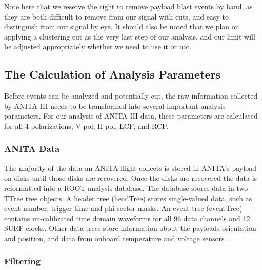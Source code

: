 Note here that we reserve the right to remove payload blast events by hand, as they are both difficult to remove from our signal with cuts, and easy to distinguish from our signal by eye.  It should also be noted that we plan on applying a clustering cut as the very last step of our analysis, and our limit will be adjusted appropriately whether we need to use it or not.

\subsection{The Calculation of Analysis Parameters}

Before events can be analyzed and potentially cut, the raw information collected by ANITA-III needs to be transformed into several important analysis parameters.  For our analysis of ANITA-III data, these parameters are calculated for all 4 polarizations, V-pol, H-pol, LCP, and RCP.

\subsubsection{ANITA Data}

The majority of the data an ANITA flight collects is stored in ANITA's payload on disks until those disks are recovered.  Once the disks are recovered the data is reformatted into a ROOT analysis database.  The database stores data in two TTree tree objects.  A header tree (headTree) stores single-valued data, such as event number, trigger time and phi sector masks.  An event tree (eventTree) contains un-calibrated time domain waveforms for all 96 data channels and 12 SURF clocks.  Other data trees store information about the payloads orientation and position, and data from onboard temperature and voltage sensors \cite{sam}.

\subsubsection{Filtering}

